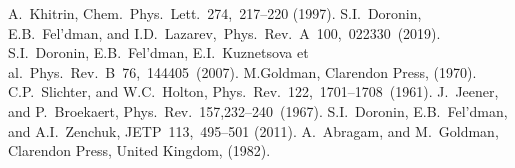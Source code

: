 \begin{thebibliography}{}
%
%
%
%
%
%
%
%
%
%
%
A.~Khitrin, Chem.~Phys.~Lett.~274,~217–220 (1997).
%
S.I.~Doronin, E.B.~Fel'dman, and  I.D.~Lazarev,~Phys.~Rev.~A~100,~022330~(2019).
%
%
%
S.I.~Doronin, E.B.~Fel’dman, E.I.~Kuznetsova et al.~Phys.~Rev.~B~76,~144405~(2007).
%
M.Goldman, Clarendon Press, (1970).
%
C.P.~Slichter, and  W.C.~Holton, Phys.~Rev.~122,~1701–1708~(1961).
%
J.~Jeener, and P.~Broekaert, Phys.~Rev.~157,232–240~(1967).
%
%
S.I.~Doronin, E.B.~Fel’dman, and  A.I.~Zenchuk, JETP~113,~495–501 (2011).
%
A.~Abragam, and M.~Goldman, Clarendon Press, United Kingdom, (1982).
%
%
%

\end{thebibliography}
